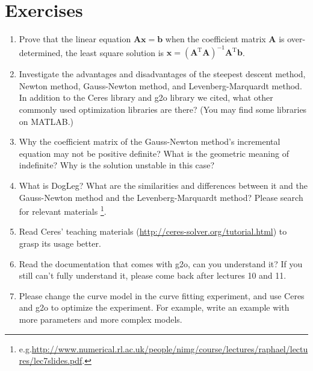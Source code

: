 \section*{Exercises}
\begin{enumerate}
    \item Prove that the linear equation $\mathbf{A} \mathbf{x} = \mathbf{b}$ when the coefficient matrix $\mathbf{A}$ is over-determined, the least square solution is $\mathbf{x} = (\mathbf{A}^\mathrm{T}\mathbf{A})^{-1}\mathbf{A}^\mathrm{T} \mathbf{b}$.
    \item Investigate the advantages and disadvantages of the steepest descent method, Newton method, Gauss-Newton method, and Levenberg-Marquardt method. In addition to the Ceres library and g2o library we cited, what other commonly used optimization libraries are there? (You may find some libraries on MATLAB.)
    \item Why the coefficient matrix of the Gauss-Newton method's incremental equation may not be positive definite? What is the geometric meaning of indefinite? Why is the solution unstable in this case?
    \item What is DogLeg? What are the similarities and differences between it and the Gauss-Newton method and the Levenberg-Marquardt method? Please search for relevant materials \footnote{\mbox{e.g.}\url{http://www.numerical.rl.ac.uk/people/nimg/course/lectures/raphael/lectures/lec7slides.pdf}. }.
    \item Read Ceres' teaching materials (\url{http://ceres-solver.org/tutorial.html}) to grasp its usage better.
    \item Read the documentation that comes with g2o, can you understand it? If you still can't fully understand it, please come back after lectures 10 and 11.
    \item[\optional] Please change the curve model in the curve fitting experiment, and use Ceres and g2o to optimize the experiment. For example, write an example with more parameters and more complex models.
\end{enumerate}